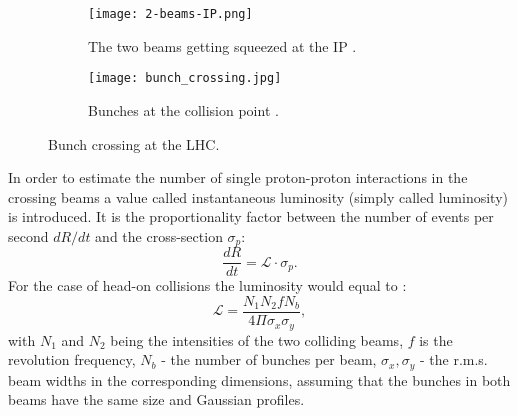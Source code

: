 	\begin{figure}[htbp]
	\begin{subfigure}[t]{0.48\textwidth}
		\texttt{[image: 2-beams-IP.png]}
		\caption[Two beams]{The two beams getting squeezed at the IP \cite{2beams}.}
		\label{fig::2beams}
	\end{subfigure}
	\hfill
	\begin{subfigure}[t]{0.48\textwidth}
		\texttt{[image: bunch\_crossing.jpg]}
		\caption[Bunches colliding]{Bunches at the collision point \cite{collisions}.}
		\label{fig::bunches_collision}
	\end{subfigure}
	\caption{Bunch crossing at the LHC.}
	\label{fig::interaction_point}
	\end{figure}
	In order to estimate the number of single proton-proton interactions in the crossing beams a value called instantaneous luminosity (simply called luminosity) is introduced. It is the proportionality factor between the number of events per second $dR/dt$ and the cross-section $\sigma_p$:
	 \begin{equation}
	\nonumber
	\frac{dR}{dt} = \mathcal{L} \cdot \sigma_p.
	\end{equation}
	For the case of head-on collisions the luminosity would equal to \cite{Lumi}:
	\begin{equation}
	\mathcal{L} = \frac{N_1N_2fN_b}{4\Pi \sigma_x \sigma_y},
	\end{equation}
	with $N_1$ and $N_2$ being the intensities of the two colliding beams, $f$ is the revolution frequency, $N_b$ - the number of bunches per beam, $ \sigma_x,\sigma_y$ - the r.m.s. beam widths in the corresponding dimensions, assuming that the bunches in both beams have the same size and Gaussian profiles. \\

